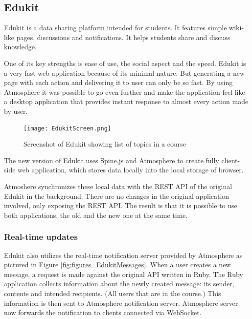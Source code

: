 \subsection{Edukit}


Edukit is a data sharing platform intended for students. It features simple wiki-like pages, discussions and notifications. It helps students share and discuss knowledge. 

One of its key strengths is ease of use, the social aspect and the speed. Edukit is a very fast web application because of its minimal nature. But generating a new page with each action and delivering it to user can only be so fast. By using Atmosphere it was possible to go even further and make the application feel like a desktop application that provides instant response to almost every action made by user. 

\begin{figure}[htbp]
  \centering
    \texttt{[image: EdukitScreen.png]}
  \caption{Screenshot of Edukit showing list of topics in a course}
  \label{fig:figures_EdukitScreen}
\end{figure}

The new version of Edukit uses Spine.js and Atmosphere to create fully client-side web application, which stores data locally into the local storage of browser.

Atmoshere synchronizes these local data with the REST API of the original Edukit in the background. There are no changes in the original application involved, only exposing the REST API. The result is that it is possible to use both applications, the old and the new one at the same time.

\subsubsection{Real-time updates}

Edukit also utilizes the real-time notification server provided by Atmosphere as pictured in Figure \ref{fig:figures_EdukitMessages}. When a user creates a new message, a request is made against the original API written in Ruby.  The Ruby application collects information about the newly created message: its sender, contents and intended recipients. (All users that are in the course.) This information is then sent to Atmosphere notification server.  Atmosphere server now forwards the notification to clients connected via WebSocket. 


